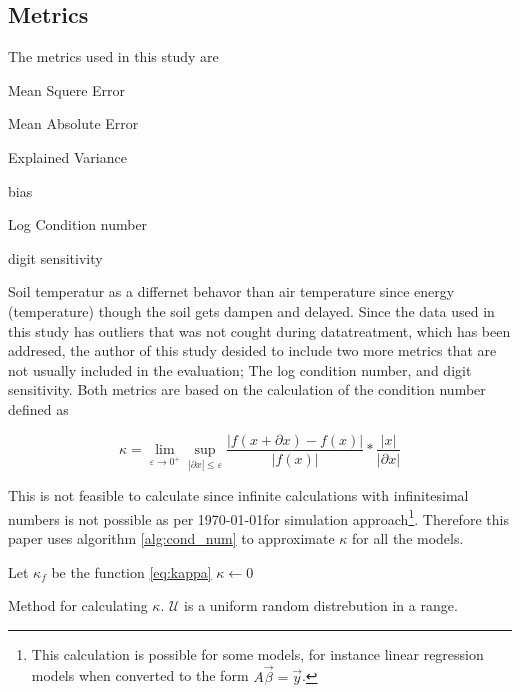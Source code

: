 \subsection{Metrics}

The metrics used in this study are

\begin{itemize*}
	\item Mean Squere Error
	\item Mean Absolute Error
	\item Explained Variance
	\item bias
	\item Log Condition number
	\item digit sensitivity
\end{itemize*}


Soil temperatur as a differnet behavor than air temperature since energy (temperature) though the soil gets dampen and delayed. Since the data used in this study has outliers that was not cought during datatreatment, which has been addresed, the author of this study desided to include two more metrics that are not usually included in the evaluation; The log condition number, and digit sensitivity. Both metrics are based on the calculation of the condition number defined as 

\begin{equation}\label{eq:kappa}
\kappa = \lim\limits_{\varepsilon \to 0^+} \sup\limits_{|\partial x|\leq\varepsilon}  \frac{\left|f(x+\partial x) - f(x)\right|}{|f(x)|}*\frac{|x|}{|\partial x|} 
\end{equation}

This is not feasible to calculate since infinite calculations with infinitesimal numbers is not possible as per \today for simulation approach\footnote{This calculation is possible for some models, for instance linear regression models when converted to the form $A\vec{\beta} = \vec{y}$.}. Therefore this paper uses algorithm \ref{alg:cond_num} to approximate $\kappa$ for all the models.

\begin{algorithm}[H]
	\SetAlgoLined
	Let $\kappa_f$ be the function \ref{eq:kappa}\;
	$\kappa\gets 0$\;
	\Return{$\kappa$}
	\caption{Method for calculating $\kappa$. $\mathcal{U}$ is a uniform random distrebution in a range.}
	\label{alg:cond_num}
\end{algorithm}

